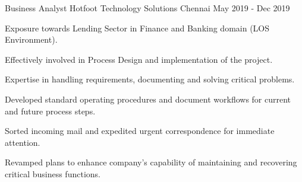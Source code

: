 


\begin{cventries}


\cventry
{Business Analyst} %
{Hotfoot Technology Solutions} %
{Chennai} %
{May 2019 - Dec 2019} %
{ %
\begin{cvitems}
\item {Exposure towards Lending Sector in Finance and Banking domain (LOS Environment).}
\item {Effectively involved in Process Design and implementation of the project.}
\item {Expertise in handling requirements, documenting and solving critical problems.}
\item {Developed standard operating procedures and document workflows for current and future process steps.}
\item {Sorted incoming mail and expedited urgent correspondence for immediate attention.}
\item {Revamped plans to enhance company's capability of maintaining and recovering critical business functions.}
\end{cvitems}
}


\end{cventries}

